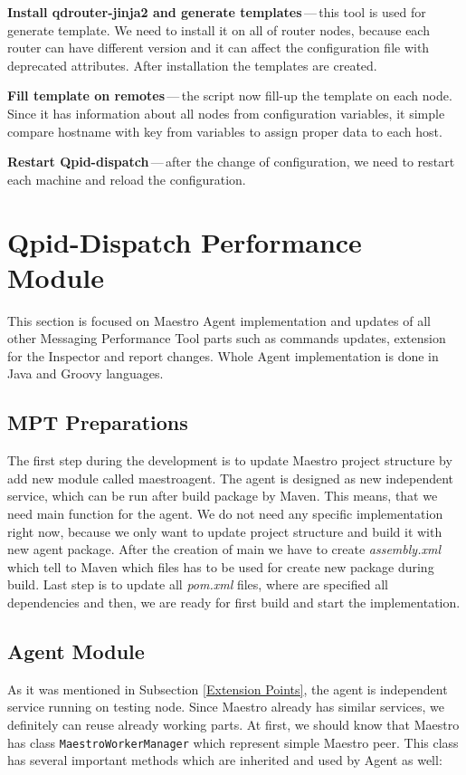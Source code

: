 \begin{description}
	\item \textbf{Install qdrouter-jinja2 and generate templates}\,---\,this tool is used for generate template. We need to install it on all of router nodes, because each router can have different version and it can affect the configuration file with deprecated attributes. After installation the templates are created.
	\item \textbf{Fill template on remotes}\,---\,the script now fill-up the template on each node. Since it has information about all nodes from configuration variables, it simple compare hostname with key from variables to assign proper data to each host.
	\item \textbf{Restart Qpid-dispatch}\,---\,after the change of configuration, we need to restart each machine and reload the configuration.
\end{description}

\section{Qpid-Dispatch Performance Module}
This section is focused on Maestro Agent implementation and updates of all other Messaging Performance Tool parts such as commands updates, extension for the Inspector and report changes. Whole Agent implementation is done in Java and Groovy languages.

\subsection{MPT Preparations}
\label{MPT Preparations}
The first step during the development is to update Maestro project structure by add new module called maestro\-agent. The agent is designed as new independent service, which can be run after build package by Maven. This means, that we need main function for the agent. We do not need any specific implementation right now, because we only want to update project structure and build it with new agent package. After the creation of main we have to create \emph{assembly.xml} which tell to Maven which files has to be used for create new package during build. Last step is to update all \emph{pom.xml} files, where are specified all dependencies and then, we are ready for first build and start the implementation.

\subsection{Agent Module}
As it was mentioned in Subsection \ref{Extension Points}, the agent is independent service running on testing node. Since Maestro already has similar services, we definitely can reuse already working parts. At first, we should know that Maestro has class \texttt{MaestroWorkerManager} which represent simple Maestro peer. This class has several important methods which are inherited and used by Agent as well:

